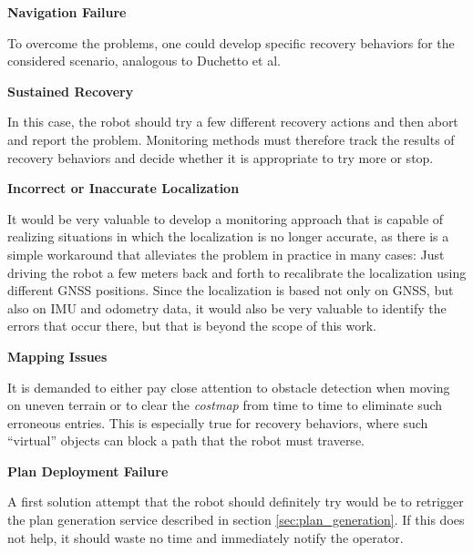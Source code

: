 \documentclass[english, master, utf8]{base/thesis_KBS}
\begin{document}
\noindent
\textbf{Navigation Failure}\newline

\noindent
To overcome the problems, one could develop specific recovery behaviors for the considered scenario, analogous to Duchetto et al.\newline

\noindent
\textbf{Sustained Recovery}\newline

\noindent
In this case, the robot should try a few different recovery actions and then abort and report the problem.
Monitoring methods must therefore track the results of recovery behaviors and decide whether it is appropriate to try more or stop.\newline

\noindent
\textbf{Incorrect or Inaccurate Localization}\newline

\noindent
It would be very valuable to develop a monitoring approach that is capable of realizing situations in which the localization is no longer accurate, as there is a 
simple workaround that alleviates the problem in practice in many cases: Just driving the robot a few meters back and forth to recalibrate the localization
using different GNSS positions. Since the localization is based not only on GNSS, but also on IMU and odometry data, it would also be very valuable to identify
the errors that occur there, but that is beyond the scope of this work.\newline

\noindent
\textbf{Mapping Issues}\newline

\noindent
It is demanded to either pay close attention to obstacle detection when moving on uneven terrain or to clear the \textit{costmap} from time to time
to eliminate such erroneous entries. This is especially true for recovery behaviors,  where such ``virtual'' objects can block a path that the robot must traverse.\newline

\noindent
\textbf{Plan Deployment Failure}\newline

\noindent
A first solution attempt that the robot should definitely try would be to retrigger the plan generation service described in section \ref{sec:plan_generation}. 
If this does not help, it should waste no time and immediately notify the operator.\newline
\end{document}
